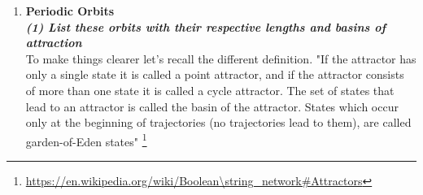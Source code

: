\documentclass[10pt,a4paper]{article}
\begin{document}
\begin{enumerate}
\newpage
\item \textbf{Periodic Orbits}\\
\textbf{\textit{(1) List these orbits with their respective lengths and basins of attraction}}\\

To make things clearer let's recall the different definition. "If the attractor has only a single state it is called a point attractor, and if the attractor consists of more than one state it is called a cycle attractor. The set of states that lead to an attractor is called the basin of the attractor. States which occur only at the beginning of trajectories (no trajectories lead to them), are called garden-of-Eden states" \footnote{\url{https://en.wikipedia.org/wiki/Boolean\string_network\#Attractors}}\\





\end{enumerate}
\end{document}
